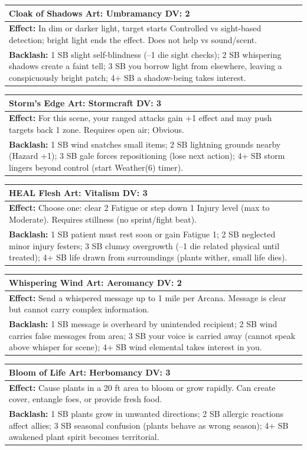 \documentclass[11pt]{report}
\newenvironment{spellentry}[3]{%
  \begin{center}
    \begin{tabular}{|p{5.5in}|}
      \hline
      \textbf{#1} \hfill \textbf{Art:} #2 \hfill \textbf{DV:} #3 \\
      \hline
}{%
      \hline
    \end{tabular}
  \end{center}
}
\begin{document}
\begin{spellentry}{Cloak of Shadows}{Umbramancy}{2}
\textbf{Effect:} In dim or darker light, target starts Controlled vs sight-based detection; bright light ends the effect. Does not help vs sound/scent.\\
\textbf{Backlash:} 1 SB slight self-blindness (--1 die sight checks); 2 SB whispering shadows create a faint tell; 3 SB you borrow light from elsewhere, leaving a conspicuously bright patch; 4+ SB a shadow-being takes interest.
\end{spellentry}

\begin{spellentry}{Storm's Edge}{Stormcraft}{3}
\textbf{Effect:} For this scene, your ranged attacks gain +1 effect and may push targets back 1 zone. Requires open air; Obvious.\\
\textbf{Backlash:} 1 SB wind snatches small items; 2 SB lightning grounds nearby (Hazard +1); 3 SB gale forces repositioning (lose next action); 4+ SB storm lingers beyond control (start Weather(6) timer).
\end{spellentry}

\begin{spellentry}{HEAL Flesh}{Vitalism}{3}
\textbf{Effect:} Choose one: clear 2 Fatigue or step down 1 Injury level (max to Moderate). Requires stillness (no sprint/fight beat).\\
\textbf{Backlash:} 1 SB patient must rest soon or gain Fatigue 1; 2 SB neglected minor injury festers; 3 SB clumsy overgrowth (--1 die related physical until treated); 4+ SB life drawn from surroundings (plants wither, small life dies).
\end{spellentry}

\begin{spellentry}{Whispering Wind}{Aeromancy}{2}
\textbf{Effect:} Send a whispered message up to 1 mile per Arcana. Message is clear but cannot carry complex information.\\
\textbf{Backlash:} 1 SB message is overheard by unintended recipient; 2 SB wind carries false messages from area; 3 SB your voice is carried away (cannot speak above whisper for scene); 4+ SB wind elemental takes interest in you.
\end{spellentry}

\begin{spellentry}{Bloom of Life}{Herbomancy}{3}
\textbf{Effect:} Cause plants in a 20 ft area to bloom or grow rapidly. Can create cover, entangle foes, or provide fresh food.\\
\textbf{Backlash:} 1 SB plants grow in unwanted directions; 2 SB allergic reactions affect allies; 3 SB seasonal confusion (plants behave as wrong season); 4+ SB awakened plant spirit becomes territorial.
\end{spellentry}
\end{document}
